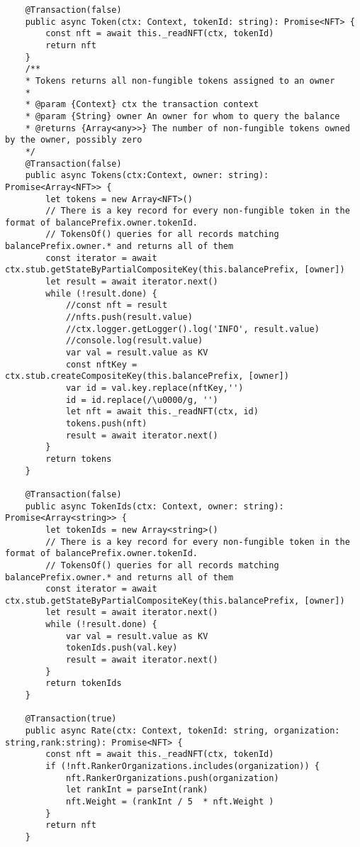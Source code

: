 \begin{lstlisting}
    @Transaction(false)
    public async Token(ctx: Context, tokenId: string): Promise<NFT> {
        const nft = await this._readNFT(ctx, tokenId)
        return nft
    }
    /**
    * Tokens returns all non-fungible tokens assigned to an owner
    *
    * @param {Context} ctx the transaction context
    * @param {String} owner An owner for whom to query the balance
    * @returns {Array<any>>} The number of non-fungible tokens owned by the owner, possibly zero
    */
    @Transaction(false)
    public async Tokens(ctx:Context, owner: string): Promise<Array<NFT>> {
        let tokens = new Array<NFT>()
        // There is a key record for every non-fungible token in the format of balancePrefix.owner.tokenId.
        // TokensOf() queries for all records matching balancePrefix.owner.* and returns all of them
        const iterator = await ctx.stub.getStateByPartialCompositeKey(this.balancePrefix, [owner])
        let result = await iterator.next()
        while (!result.done) {
            //const nft = result
            //nfts.push(result.value)
            //ctx.logger.getLogger().log('INFO', result.value)
            //console.log(result.value)
            var val = result.value as KV
            const nftKey = ctx.stub.createCompositeKey(this.balancePrefix, [owner])
            var id = val.key.replace(nftKey,'')
            id = id.replace(/\u0000/g, '')
            let nft = await this._readNFT(ctx, id)
            tokens.push(nft)
            result = await iterator.next()
        }
        return tokens
    }

    @Transaction(false)
    public async TokenIds(ctx: Context, owner: string): Promise<Array<string>> {
        let tokenIds = new Array<string>()
        // There is a key record for every non-fungible token in the format of balancePrefix.owner.tokenId.
        // TokensOf() queries for all records matching balancePrefix.owner.* and returns all of them
        const iterator = await ctx.stub.getStateByPartialCompositeKey(this.balancePrefix, [owner])
        let result = await iterator.next()
        while (!result.done) {
            var val = result.value as KV
            tokenIds.push(val.key)
            result = await iterator.next()
        }
        return tokenIds
    }

    @Transaction(true)
    public async Rate(ctx: Context, tokenId: string, organization: string,rank:string): Promise<NFT> {
        const nft = await this._readNFT(ctx, tokenId)
        if (!nft.RankerOrganizations.includes(organization)) {
            nft.RankerOrganizations.push(organization)
            let rankInt = parseInt(rank)
            nft.Weight = (rankInt / 5  * nft.Weight )
        }
        return nft
    }


\end{lstlisting}
